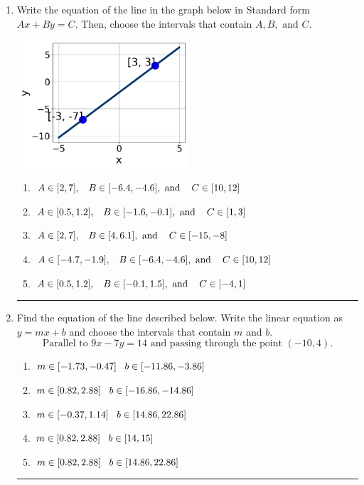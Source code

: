 \documentclass[14pt]{extbook}
\newcommand{\litem}[1]{\item#1\hspace*{-1cm}\rule{\textwidth}{0.4pt}}
\begin{document}
\begin{enumerate}
{\begin{enumerate}[label=\Alph*.]
\end{enumerate} }
\litem{
Write the equation of the line in the graph below in Standard form $Ax+By=C$. Then, choose the intervals that contain $A, B, \text{ and } C$.
\begin{center}
    \includegraphics[width=0.5\textwidth]{../Figures/linearGraphToStandardB.png}
\end{center}
\begin{enumerate}[label=\Alph*.]
\item \( A \in [2, 7], \hspace{3mm} B \in [-6.4, -4.6], \text{ and } \hspace{3mm} C \in [10, 12] \)
\item \( A \in [0.5, 1.2], \hspace{3mm} B \in [-1.6, -0.1], \text{ and } \hspace{3mm} C \in [1, 3] \)
\item \( A \in [2, 7], \hspace{3mm} B \in [4, 6.1], \text{ and } \hspace{3mm} C \in [-15, -8] \)
\item \( A \in [-4.7, -1.9], \hspace{3mm} B \in [-6.4, -4.6], \text{ and } \hspace{3mm} C \in [10, 12] \)
\item \( A \in [0.5, 1.2], \hspace{3mm} B \in [-0.1, 1.5], \text{ and } \hspace{3mm} C \in [-4, 1] \)

\end{enumerate} }
\litem{
Find the equation of the line described below. Write the linear equation as $ y=mx+b $ and choose the intervals that contain $m$ and $b$.\[ \text{Parallel to } 9 x - 7 y = 14 \text{ and passing through the point } (-10, 4). \]\begin{enumerate}[label=\Alph*.]
\item \( m \in [-1.73, -0.47] \hspace*{3mm} b \in [-11.86, -3.86] \)
\item \( m \in [0.82, 2.88] \hspace*{3mm} b \in [-16.86, -14.86] \)
\item \( m \in [-0.37, 1.14] \hspace*{3mm} b \in [14.86, 22.86] \)
\item \( m \in [0.82, 2.88] \hspace*{3mm} b \in [14, 15] \)
\item \( m \in [0.82, 2.88] \hspace*{3mm} b \in [14.86, 22.86] \)


\end{enumerate}}
\end{enumerate}
\end{document}
